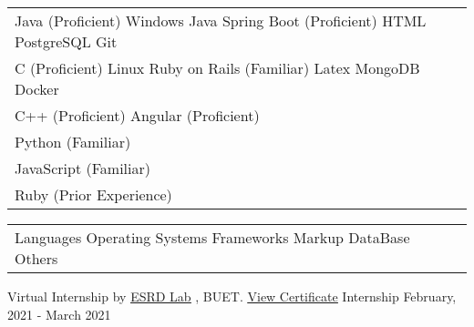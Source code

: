 \documentclass[]{awesome-cv}
\begin{document}
\begin{cventries}
	\cventry
	{\def\arraystretch{1.15}{\begin{tabular}{ l l }
				Java (Proficient) \hspace{1.2cm} Windows \hspace{1.6cm}  Java Spring Boot (Proficient) \hspace{1cm} HTML \hspace{1.2cm} PostgreSQL \hspace{1.4cm} Git  & {\skill{ }} \\
				C (Proficient) \hspace{1.6cm} Linux \hspace{2.4cm} Ruby on Rails (Familiar)  \hspace{1.3cm} Latex \hspace{1.4cm} MongoDB \hspace{1.4cm} Docker & {\skill{ }} \\
				C++ (Proficient) \hspace{4.7cm} Angular (Proficient) \hspace{1.4cm}   & {\skill{ }} \\
				Python (Familiar) \hspace{2cm}   & {\skill{ }} \\
				JavaScript (Familiar)  & {\skill{ }} \\
				Ruby (Prior Experience)  & {\skill{ }} \\
	\end{tabular}}}
	{\def\arraystretch{1.15}{\begin{tabular}{ l l }
		Languages \hspace{1cm} Operating Systems \hspace{1.2cm} Frameworks \hspace{1.5cm} Markup \hspace{1cm} DataBase \hspace{1cm} Others  & {\skill{ }} \\
		\end{tabular}}}
	{}
	{}
	{}
	
\end{cventries}

\vspace{-7mm}


\begin{cventries}
	\cventry
	{Virtual Internship by \href{http://vinternship.org/}{\underline{ESRD Lab}} , BUET.  \href{https://drive.google.com/drive/u/0/folders/1sx3UMH5gBBTkda5ivJqcNqGb4bhuACwu}{\underline{View Certificate}}}
	{Internship}
	{}
	{February, 2021 - March 2021}
	{}
\end{cventries}
\end{document}
